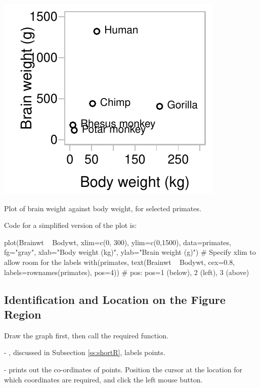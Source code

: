 \begin{marginfigure}
\begin{Schunk}


\centerline{\includegraphics[width=\textwidth]{figs/07-brain-body-1} }

\end{Schunk}
\caption{Plot of brain weight against body weight, for selected
primates.
}\label{fig:primates}
\end{marginfigure}

Code for a simplified version of the plot is:
\begin{Schunk}
\begin{Sinput}
plot(Brainwt ~ Bodywt, xlim=c(0, 300),
     ylim=c(0,1500), data=primates, fg="gray",
     xlab="Body weight (kg)",
     ylab="Brain weight (g)")
# Specify xlim to allow room for the labels
with(primates,
     text(Brainwt ~ Bodywt, cex=0.8,
          labels=rownames(primates), pos=4))
# pos: pos=1 (below), 2 (left), 3 (above)
\end{Sinput}
\end{Schunk}

\subsection*{Identification and Location on the Figure Region}
Draw the graph first, then call the required function.
\begin{itemizz}
\item[-] , discussed in Subsection \ref{ss:shortR}, labels
points.
\item[-]  prints out the co-ordinates of
points. Position the cursor at the location for which coordinates are
required, and click the left mouse button.
\end{itemizz}

